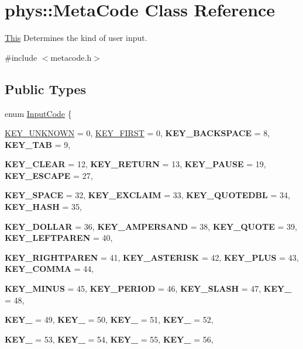 \hypertarget{classphys_1_1MetaCode}{
\section{phys::MetaCode Class Reference}
\label{da/dc9/classphys_1_1MetaCode}
}


\hyperlink{structThis}{This} Determines the kind of user input.  




{\ttfamily \#include $<$metacode.h$>$}

\subsection*{Public Types}
\begin{DoxyCompactItemize}
\item 
enum \hyperlink{classphys_1_1MetaCode_a3e501cbb5bf0f6f1fdb7211465bda8d8}{InputCode} \{ \par
\hyperlink{classphys_1_1MetaCode_a3e501cbb5bf0f6f1fdb7211465bda8d8a061a36c9b5d9661314fd9d276b33042f}{KEY\_\-UNKNOWN} =  0, 
\hyperlink{classphys_1_1MetaCode_a3e501cbb5bf0f6f1fdb7211465bda8d8a45d7f3824a440f5bea5e616a6d6ea0b5}{KEY\_\-FIRST} =  0, 
{\bfseries KEY\_\-BACKSPACE} =  8, 
{\bfseries KEY\_\-TAB} =  9, 
\par
{\bfseries KEY\_\-CLEAR} =  12, 
{\bfseries KEY\_\-RETURN} =  13, 
{\bfseries KEY\_\-PAUSE} =  19, 
{\bfseries KEY\_\-ESCAPE} =  27, 
\par
{\bfseries KEY\_\-SPACE} =  32, 
{\bfseries KEY\_\-EXCLAIM} =  33, 
{\bfseries KEY\_\-QUOTEDBL} =  34, 
{\bfseries KEY\_\-HASH} =  35, 
\par
{\bfseries KEY\_\-DOLLAR} =  36, 
{\bfseries KEY\_\-AMPERSAND} =  38, 
{\bfseries KEY\_\-QUOTE} =  39, 
{\bfseries KEY\_\-LEFTPAREN} =  40, 
\par
{\bfseries KEY\_\-RIGHTPAREN} =  41, 
{\bfseries KEY\_\-ASTERISK} =  42, 
{\bfseries KEY\_\-PLUS} =  43, 
{\bfseries KEY\_\-COMMA} =  44, 
\par
{\bfseries KEY\_\-MINUS} =  45, 
{\bfseries KEY\_\-PERIOD} =  46, 
{\bfseries KEY\_\-SLASH} =  47, 
{\bfseries KEY\_} =  48, 
\par
{\bfseries KEY\_} =  49, 
{\bfseries KEY\_} =  50, 
{\bfseries KEY\_} =  51, 
{\bfseries KEY\_} =  52, 
\par
{\bfseries KEY\_} =  53, 
{\bfseries KEY\_} =  54, 
{\bfseries KEY\_} =  55, 
{\bfseries KEY\_} =  56, 
\par

\end{DoxyCompactItemize}
